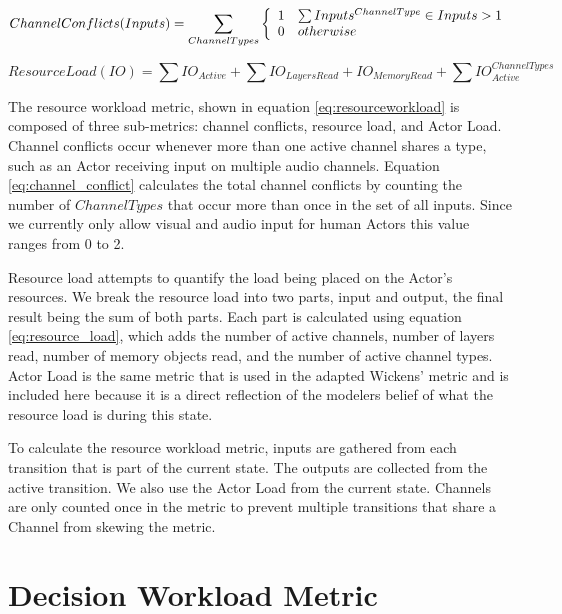 \begin{equation}
  ChannelConflicts(Inputs) = \sum_{ChannelTypes} \left\{
    \begin{array}{l l}
      1 & \sum Inputs^{ChannelType} \in Inputs > 1 \\
      0 & otherwise \\
    \end{array}
    \right.
  \label{eq:channel_conflict}
\end{equation}

\begin{equation}
  ResourceLoad(IO) = \sum IO_{Active} + \sum IO_{LayersRead} + IO_{MemoryRead} + \sum IO_{Active}^{ChannelTypes}
  \label{eq:resource_load}
\end{equation}

The resource workload metric, shown in equation \ref{eq:resourceworkload} is composed of three sub-metrics: channel conflicts, resource load, and Actor Load.  Channel conflicts occur whenever more than one active channel shares a type, such as an Actor receiving input on multiple audio channels.  Equation \ref{eq:channel_conflict} calculates the total channel conflicts by counting the number of $ChannelTypes$ that occur more than once in the set of all inputs.  Since we currently only allow visual and audio input for human Actors this value ranges from 0 to 2.  

Resource load attempts to quantify the load being placed on the Actor's resources.  We break the resource load into two parts, input and output, the final result being the sum of both parts.  Each part is calculated using equation \ref{eq:resource_load}, which adds the number of active channels, number of layers read, number of memory objects read, and the number of active channel types.  Actor Load is the same metric that is used in the adapted Wickens' metric and is included here because it is a direct reflection of the modelers belief of what the resource load is during this state.

To calculate the resource workload metric, inputs are gathered from each transition that is part of the current state.  The outputs are collected from the active transition.  We also use the Actor Load from the current state.  Channels are only counted once in the metric to prevent multiple transitions that share a Channel from skewing the metric.


\section{Decision Workload Metric}

